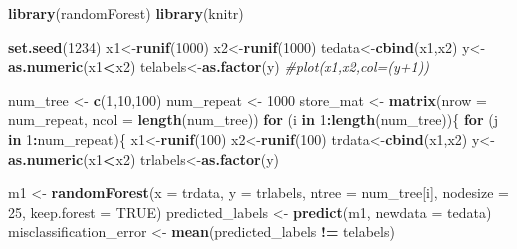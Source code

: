 \documentclass[
]{article}
\newenvironment{Shaded}{\begin{snugshade}}{\end{snugshade}}
\newcommand{\AttributeTok}[1]{\textcolor[rgb]{0.13,0.29,0.53}{#1}}
\newcommand{\CommentTok}[1]{\textcolor[rgb]{0.56,0.35,0.01}{\textit{#1}}}
\newcommand{\ConstantTok}[1]{\textcolor[rgb]{0.56,0.35,0.01}{#1}}
\newcommand{\ControlFlowTok}[1]{\textcolor[rgb]{0.13,0.29,0.53}{\textbf{#1}}}
\newcommand{\DecValTok}[1]{\textcolor[rgb]{0.00,0.00,0.81}{#1}}
\newcommand{\FunctionTok}[1]{\textcolor[rgb]{0.13,0.29,0.53}{\textbf{#1}}}
\newcommand{\NormalTok}[1]{#1}
\newcommand{\OtherTok}[1]{\textcolor[rgb]{0.56,0.35,0.01}{#1}}
\newcommand{\SpecialCharTok}[1]{\textcolor[rgb]{0.81,0.36,0.00}{\textbf{#1}}}
\begin{document}
\begin{Shaded}
\begin{Highlighting}[]
\FunctionTok{library}\NormalTok{(randomForest)}
\FunctionTok{library}\NormalTok{(knitr)}

\FunctionTok{set.seed}\NormalTok{(}\DecValTok{1234}\NormalTok{)}
\NormalTok{x1}\OtherTok{\textless{}{-}}\FunctionTok{runif}\NormalTok{(}\DecValTok{1000}\NormalTok{)}
\NormalTok{x2}\OtherTok{\textless{}{-}}\FunctionTok{runif}\NormalTok{(}\DecValTok{1000}\NormalTok{)}
\NormalTok{tedata}\OtherTok{\textless{}{-}}\FunctionTok{cbind}\NormalTok{(x1,x2)}
\NormalTok{y}\OtherTok{\textless{}{-}}\FunctionTok{as.numeric}\NormalTok{(x1}\SpecialCharTok{\textless{}}\NormalTok{x2)}
\NormalTok{telabels}\OtherTok{\textless{}{-}}\FunctionTok{as.factor}\NormalTok{(y)}
\CommentTok{\#plot(x1,x2,col=(y+1))}

\NormalTok{num\_tree }\OtherTok{\textless{}{-}} \FunctionTok{c}\NormalTok{(}\DecValTok{1}\NormalTok{,}\DecValTok{10}\NormalTok{,}\DecValTok{100}\NormalTok{)}
\NormalTok{num\_repeat }\OtherTok{\textless{}{-}} \DecValTok{1000}
\NormalTok{store\_mat }\OtherTok{\textless{}{-}} \FunctionTok{matrix}\NormalTok{(}\AttributeTok{nrow =}\NormalTok{ num\_repeat, }\AttributeTok{ncol =} \FunctionTok{length}\NormalTok{(num\_tree))}
\ControlFlowTok{for}\NormalTok{ (i }\ControlFlowTok{in} \DecValTok{1}\SpecialCharTok{:}\FunctionTok{length}\NormalTok{(num\_tree))\{}
  \ControlFlowTok{for}\NormalTok{ (j }\ControlFlowTok{in} \DecValTok{1}\SpecialCharTok{:}\NormalTok{num\_repeat)\{}
\NormalTok{    x1}\OtherTok{\textless{}{-}}\FunctionTok{runif}\NormalTok{(}\DecValTok{100}\NormalTok{)}
\NormalTok{    x2}\OtherTok{\textless{}{-}}\FunctionTok{runif}\NormalTok{(}\DecValTok{100}\NormalTok{)}
\NormalTok{    trdata}\OtherTok{\textless{}{-}}\FunctionTok{cbind}\NormalTok{(x1,x2)}
\NormalTok{    y}\OtherTok{\textless{}{-}}\FunctionTok{as.numeric}\NormalTok{(x1}\SpecialCharTok{\textless{}}\NormalTok{x2)}
\NormalTok{    trlabels}\OtherTok{\textless{}{-}}\FunctionTok{as.factor}\NormalTok{(y)}
    
\NormalTok{    m1 }\OtherTok{\textless{}{-}} \FunctionTok{randomForest}\NormalTok{(}\AttributeTok{x =}\NormalTok{ trdata, }\AttributeTok{y =}\NormalTok{ trlabels, }\AttributeTok{ntree =}\NormalTok{ num\_tree[i], }\AttributeTok{nodesize =} \DecValTok{25}\NormalTok{, }\AttributeTok{keep.forest =} \ConstantTok{TRUE}\NormalTok{)}
\NormalTok{    predicted\_labels }\OtherTok{\textless{}{-}} \FunctionTok{predict}\NormalTok{(m1, }\AttributeTok{newdata =}\NormalTok{ tedata)}
\NormalTok{    misclassification\_error }\OtherTok{\textless{}{-}} \FunctionTok{mean}\NormalTok{(predicted\_labels }\SpecialCharTok{!=}\NormalTok{ telabels)}
    

\end{Highlighting}
\end{Shaded}
\end{document}

